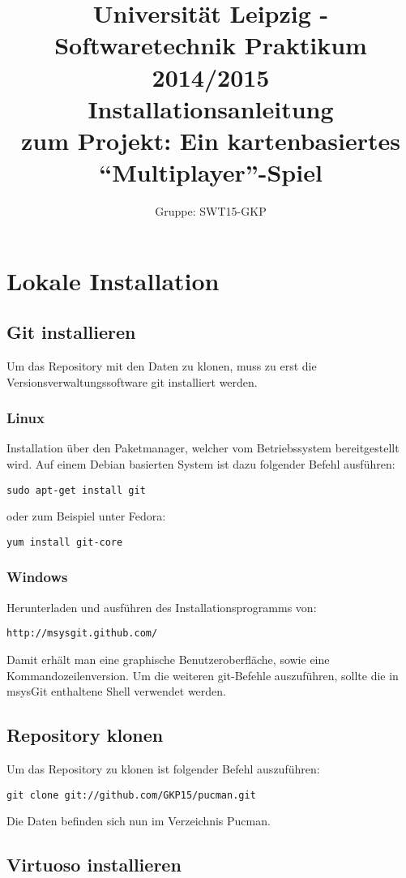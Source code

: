 \documentclass[11pt,a4paper]{article}
\author{Gruppe: SWT15-GKP}
\title{Universität Leipzig - Softwaretechnik Praktikum 2014/2015 \\  Installationsanleitung \\ zum Projekt: Ein kartenbasiertes “Multiplayer”-Spiel}
\begin{document}
\maketitle

\tableofcontents

\clearpage

\section{Lokale Installation}
\subsection{Git installieren}
Um das Repository mit den Daten zu klonen, muss zu erst die Versionsverwaltungssoftware git installiert werden.
\subsubsection{Linux}
Installation über den Paketmanager, welcher vom Betriebssystem bereitgestellt wird.
Auf einem Debian basierten System ist dazu folgender Befehl ausführen:
\begin{lstlisting}
sudo apt-get install git
\end{lstlisting}
oder zum Beispiel unter Fedora:
\begin{lstlisting}
yum install git-core
\end{lstlisting}
\subsubsection{Windows}
Herunterladen und ausführen des Installationsprogramms von:
\begin{lstlisting}
http://msysgit.github.com/
\end{lstlisting}
Damit erhält man eine graphische Benutzeroberfläche, sowie eine Kommandozeilenversion.
Um die weiteren git-Befehle auszuführen, sollte die in msysGit enthaltene Shell verwendet werden.
\subsection{Repository klonen}
Um das Repository zu klonen ist folgender Befehl auszuführen:
\begin{lstlisting}
git clone git://github.com/GKP15/pucman.git
\end{lstlisting}
Die Daten befinden sich nun im Verzeichnis Pucman.
\subsection{Virtuoso installieren}
\end{document}
